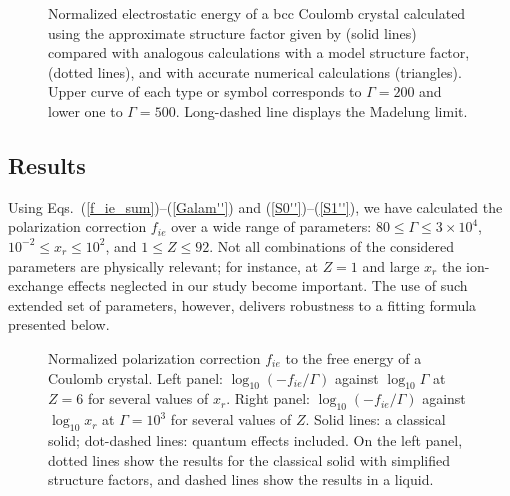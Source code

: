 \begin{figure}
    \begin{center}
    \leavevmode
    \epsfysize=70mm
    \end{center}
\caption{
Normalized electrostatic energy of a bcc Coulomb crystal
calculated using the approximate structure factor 
given by \protect{} (solid lines) 
compared with analogous calculations
with a model structure factor, \protect{} (dotted lines),
and with accurate numerical calculations \protect\cite{Baiko}
(triangles). Upper curve of each type or symbol corresponds to $\Gamma=200$
and lower one to $\Gamma=500$.
Long-dashed line displays the Madelung limit.
}
\label{fig-uelst}
\end{figure}


\subsection{Results}
%
Using Eqs.\ (\ref{f_ie_sum})--(\ref{Galam''}) 
and (\ref{S0''})--(\ref{S1''}), 
we have calculated the polarization correction
$f_{ie}$ over a wide range of parameters:
$80\leq\Gamma\leq3\times10^4$,
$10^{-2}\leq x_r\leq10^2$,
and $1\leq Z \leq 92$.
Not all combinations of the considered parameters
are physically relevant; for instance,
at $Z=1$ and large $x_r$ the ion-exchange effects
neglected in our study become important.
The use of such extended set of parameters, however,
delivers robustness to a fitting formula presented
below.

\begin{figure}
    \begin{center}
    \leavevmode
    \epsfxsize=86mm
    \end{center}
\caption{
Normalized polarization correction $f_{ie}$ 
to the free energy of a Coulomb crystal.
Left panel: $\log_{10}(-f_{ie}/\Gamma)$ against $\log_{10}\Gamma$
at $Z=6$ for several values of $x_r$.
Right panel: $\log_{10}(-f_{ie}/\Gamma)$ against $\log_{10}x_r$
at $\Gamma=10^3$ for several values of $Z$.
Solid lines: a classical solid; dot-dashed lines: 
quantum effects included.
On the left panel, dotted lines show the results
for the classical solid with simplified structure factors,
and dashed lines show the results in a liquid.
}
\label{fig-f-ie-sol}
\end{figure}


